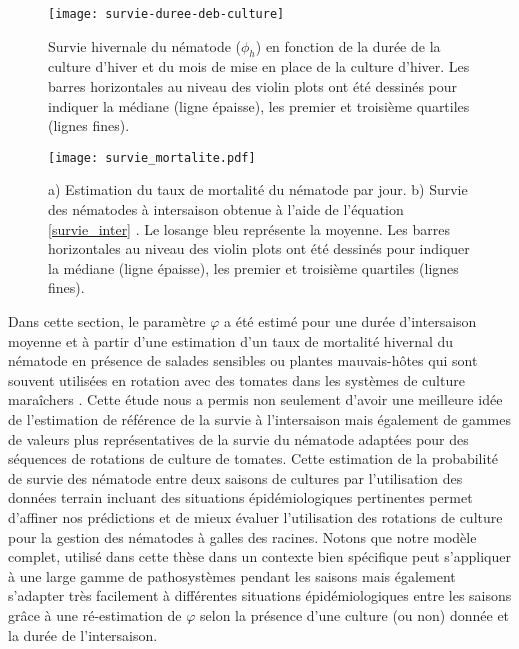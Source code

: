 	
		 \begin{figure}
			 \centering
		        \texttt{[image: survie-duree-deb-culture]}
				\caption[Survie efficace du nématode.]{Survie hivernale du nématode ($\phi_h$) en fonction de  la durée 
				de la culture d'hiver et du mois de mise en place de la culture d'hiver. 
				Les barres horizontales au niveau des violin plots ont été dessinés pour indiquer
		        la médiane (ligne épaisse), les premier et troisième quartiles (lignes fines).}
		       \label{fig1:duree_pl} 
	      \end{figure}

			 
	      \begin{figure}
			  \centering
	           \texttt{[image: survie\_mortalite.pdf]}
		      	\caption[a) Estimation du taux de mortalité du nématode  et b) survie des nématodes à intersaison]{a) 
		      	Estimation du taux de mortalité du nématode par jour. b) Survie des nématodes à intersaison obtenue à 
		      	l'aide de l'équation \eqref{survie_inter} . Le losange bleu représente la moyenne.  Les barres 
		      	horizontales au niveau des  violin plots ont été dessinés pour indiquer
	            la médiane (ligne épaisse), les premier et troisième quartiles (lignes fines).}
	            \label{fig2:survie_mort} 
		  \end{figure}
		
		
	 Dans cette section, le paramètre $\varphi$ a été estimé pour une  durée d'intersaison moyenne et à partir d'une estimation d'un taux de mortalité hivernal du nématode  en présence de salades sensibles ou plantes mauvais-hôtes qui sont souvent utilisées en rotation avec des tomates dans les systèmes de culture maraîchers \citep{Djian-Caporalino2019}. Cette étude nous a permis non seulement  d'avoir une meilleure idée de l'estimation de référence  de la survie à l'intersaison mais également de gammes de valeurs plus représentatives de la survie  du nématode adaptées pour des séquences de rotations de culture de tomates. Cette estimation de la probabilité de survie des nématode entre deux saisons de cultures  par l'utilisation des données terrain incluant  des  situations épidémiologiques pertinentes permet d'affiner nos prédictions et de mieux évaluer l'utilisation des rotations de culture  pour  la gestion des nématodes à galles des racines. Notons  que notre modèle complet, utilisé dans cette thèse dans un contexte bien spécifique peut s'appliquer à une large gamme de pathosystèmes pendant les saisons  mais également s'adapter très facilement à différentes situations épidémiologiques entre les saisons grâce à une ré-estimation de $\varphi$ selon la présence d'une culture (ou non) donnée et la durée de l'intersaison.
	 
